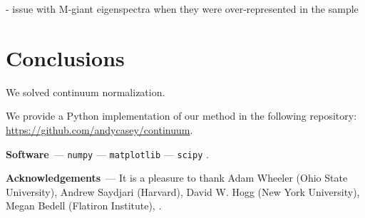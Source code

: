 \documentclass[modern]{aastex631}
\renewcommand{\paragraph}[1]{\medskip\par\noindent\textbf{#1}~---}
\begin{document}
- issue with M-giant eigenspectra when they were over-represented in the sample


\section{Conclusions}
\label{sec:conclusions}

We solved continuum normalization.


\noindent{}We provide a Python implementation of our method in the following repository: \url{https://github.com/andycasey/continuum}. 

\paragraph{Software}
\texttt{numpy} \citep{numpy} ---
\texttt{matplotlib} \citep{matplotlib} ---
\texttt{scipy} \citep{scipy}.

\paragraph{Acknowledgements}
It is a pleasure to thank
    Adam Wheeler (Ohio State University),
    Andrew Saydjari (Harvard),
    David W. Hogg (New York University),
    Megan Bedell (Flatiron Institute),
.

%
\end{document}

